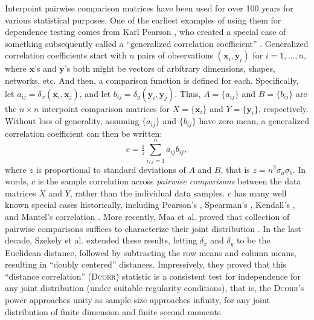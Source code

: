 \documentclass[11pt]{article}
\providecommand{\sct}[1]{{\normalfont\textsc{#1}}}
\providecommand{\mb}[1]{\boldsymbol{#1}}
\newcommand{\G}{c}
\newcommand{\Dcorr}{\sct{Dcorr}}
\newcommand{\Mantel}{\sct{Mantel}}
\begin{document}
Interpoint pairwise comparison matrices have been used for over 100 years for various statistical purposes. %
% 
One of the earliest examples of using them for dependence testing comes from  Karl Pearson \cite{Pearson1895}, who created  a special case of something subsequently called a ``generalized correlation coefficient'' \cite{KendallBook}.
Generalized correlation coefficients start with $n$ pairs of observations $(\mb{x}_i,\mb{y}_i)$ for $i=1,\ldots,n$, where $\mb{x}$'s and $\mb{y}$'s both might be vectors of arbitrary dimensions, shapes, networks, etc.  And then, a comparison function is defined for each.  Specifically, let $a_{ij}=\delta_x(\mb{x}_i,\mb{x}_j)$, and let $b_{ij}=\delta_y(\mb{y}_i,\mb{y}_j)$.  
Thus, $A=\{a_{ij}\}$ and $B=\{b_{ij}\}$ are the $n \times n$ interpoint comparison matrices for $X=\{\mb{x}_{i}\}$ and $Y=\{\mb{y}_{i}\}$, respectively.  
Without loss of generality, assuming $\{a_{ij}\}$ and $\{b_{ij}\}$ have zero mean, a generalized correlation coefficient can then be written:
\begin{equation}
\label{generalCoef}
\G= \tfrac{1}{z} {\textstyle \sum_{i,j=1}^n a_{ij} b_{ij}},
\end{equation}
where $z$ is proportional to standard deviations of $A$ and $B$, that is $z=n^2\sigma_a \sigma_b$.
In words, $\G$ is the sample correlation across \emph{pairwise comparisons} between the data matrices $X$ and $Y$, rather than the individual data samples.  
$\G$ has many well known special cases historically, including Pearson's  \cite{Pearson1895}, Spearman's \cite{Spearman1904},  Kendall's \cite{KendallBook}, and Mantel's correlation \cite{Mantel1967}. %
More recently, Maa et al. proved that collection of pairwise comparisons suffices to characterize their joint distribution \cite{Maa1996}.
In the last decade, Szekely et al. \cite{SzekelyRizzoBakirov2007} extended these results, letting $\delta_x$ and $\delta_y$ to be the Euclidean distance, followed by subtracting the row means and column means, resulting in ``doubly centered'' distances.  Impressively, they proved that this ``distance correlation'' (\Dcorr) statistic is a consistent test for independence for any joint distribution (under suitable regularity conditions), that is, the \Dcorr's power approaches unity as sample size approaches infinity, for any joint distribution of finite dimension and finite second moments.
\end{document}
